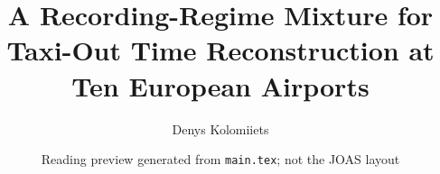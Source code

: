 \documentclass[11pt,a4paper]{article}
\date{Reading preview generated from \texttt{main.tex}; not the JOAS layout}
\title{A Recording-Regime Mixture for Taxi-Out Time Reconstruction at Ten European Airports}
\author{Denys Kolomiiets \orcid{0000-0003-3212-3251}}
\affiliation{Independent researcher, team gentle-igloo}
\newcommand{\previewaffiliation}{}
\newcommand{\placeholder}[1]{\textcolor{red}{[[RESULT:#1]]}}
\begin{document}
\maketitle
\noindent\textit{\previewaffiliation}\par

\end{document}
